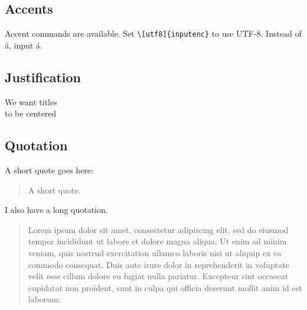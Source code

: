 \documentclass[a4paper,12pt]{article}
\newcommand{\code}[1]{\texttt{#1}}
\begin{document}
\subsection{Accents}

Accent commands are available. Set \code{\textbackslash [utf8]\{inputenc\}} to use UTF-8. Instead of
\'{a}, input  á.

\subsection{Justification}

\begin{center}
  We want titles \\
  to be centered \\
\end{center}

\subsection{Quotation}

A short quote goes here:

\begin{quote}
A short quote.
\end{quote}

I also have a long quotation.

\begin{quotation}
  Lorem ipsum dolor sit amet, consectetur adipiscing elit, sed do eiusmod tempor incididunt ut labore et dolore magna aliqua. Ut enim ad minim veniam, quis nostrud exercitation ullamco laboris nisi ut aliquip ex ea commodo consequat. Duis aute irure dolor in reprehenderit in voluptate velit esse cillum dolore eu fugiat nulla pariatur. Excepteur sint occaecat cupidatat non proident, sunt in culpa qui officia deserunt mollit anim id est laborum.
\end{quotation}
\end{document}

